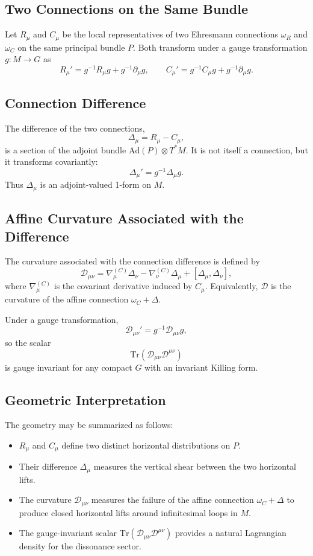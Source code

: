 \documentclass[12pt,openany]{book}
\theoremstyle{plain}
\theoremstyle{definition}
\theoremstyle{remark}
\begin{document}
\subsection*{Two Connections on the Same Bundle}

Let $R_\mu$ and $C_\mu$ be the local representatives of two Ehresmann
connections $\omega_R$ and $\omega_C$ on the same principal bundle $P$.
Both transform under a gauge transformation $g : M \to G$ as
\[
R_\mu' = g^{-1} R_\mu g + g^{-1} \partial_\mu g,
\qquad
C_\mu' = g^{-1} C_\mu g + g^{-1} \partial_\mu g.
\]
\subsection*{Connection Difference}

The difference of the two connections,
\[
\Delta_\mu = R_\mu - C_\mu,
\]
is a section of the adjoint bundle $\mathrm{Ad}(P) \otimes T^*M$. It is not
itself a connection, but it transforms covariantly:
\[
\Delta_\mu' = g^{-1} \Delta_\mu g.
\]
Thus $\Delta_\mu$ is an adjoint-valued 1-form on $M$.

\subsection*{Affine Curvature Associated with the Difference}

The curvature associated with the connection difference is defined by
\[
\mathcal{D}_{\mu\nu}
= \nabla_\mu^{(C)} \Delta_\nu
- \nabla_\nu^{(C)} \Delta_\mu
+ [\Delta_\mu, \Delta_\nu],
\]
where $\nabla_\mu^{(C)}$ is the covariant derivative induced by $C_\mu$.
Equivalently, $\mathcal{D}$ is the curvature of the affine connection
$\omega_C + \Delta$.

Under a gauge transformation,
\[
\mathcal{D}_{\mu\nu}' = g^{-1} \mathcal{D}_{\mu\nu} g,
\]
so the scalar
\[
\mathrm{Tr}(\mathcal{D}_{\mu\nu}\mathcal{D}^{\mu\nu})
\]
is gauge invariant for any compact $G$ with an invariant Killing form.

\subsection*{Geometric Interpretation}

The geometry may be summarized as follows:

\begin{itemize}
    \item $R_\mu$ and $C_\mu$ define two distinct horizontal distributions on $P$.
    \item Their difference $\Delta_\mu$ measures the vertical shear between
    the two horizontal lifts.
    \item The curvature $\mathcal{D}_{\mu\nu}$ measures the failure of the
    affine connection $\omega_C + \Delta$ to produce closed horizontal lifts
    around infinitesimal loops in $M$.
    \item The gauge-invariant scalar
    $\mathrm{Tr}(\mathcal{D}_{\mu\nu}\mathcal{D}^{\mu\nu})$ provides a
    natural Lagrangian density for the dissonance sector.
\end{itemize}
\end{document}
